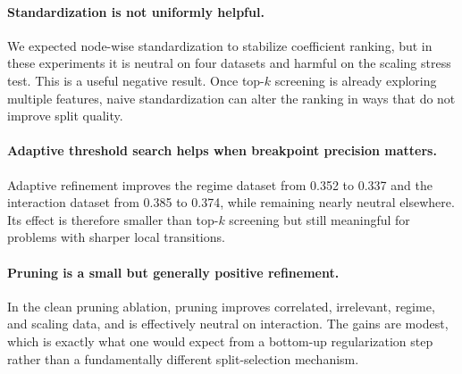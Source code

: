 \documentclass[11pt,a4paper]{article}
\begin{document}
\paragraph{Standardization is not uniformly helpful.}
We expected node-wise standardization to stabilize coefficient ranking, but in these experiments it is neutral on four datasets and harmful on the scaling stress test. This is a useful negative result. Once top-$k$ screening is already exploring multiple features, naive standardization can alter the ranking in ways that do not improve split quality.

\paragraph{Adaptive threshold search helps when breakpoint precision matters.}
Adaptive refinement improves the regime dataset from 0.352 to 0.337 and the interaction dataset from 0.385 to 0.374, while remaining nearly neutral elsewhere. Its effect is therefore smaller than top-$k$ screening but still meaningful for problems with sharper local transitions.

\paragraph{Pruning is a small but generally positive refinement.}
In the clean pruning ablation, pruning improves correlated, irrelevant, regime, and scaling data, and is effectively neutral on interaction. The gains are modest, which is exactly what one would expect from a bottom-up regularization step rather than a fundamentally different split-selection mechanism.
\end{document}
